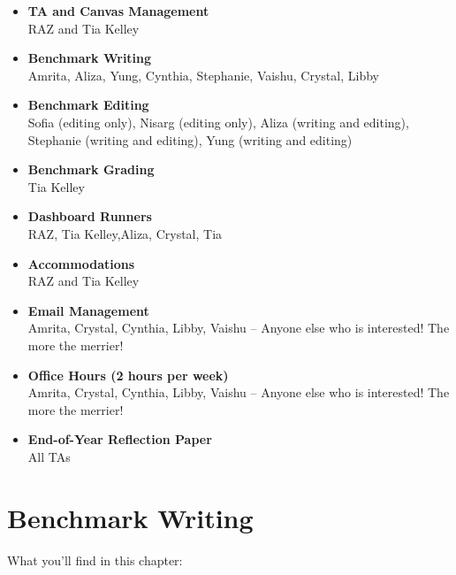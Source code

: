 \documentclass[
]{article}
\begin{document}
\begin{itemize}
\item
  \textbf{TA and Canvas Management}\\
  RAZ and Tia Kelley
\item
  \textbf{Benchmark Writing}\\
  Amrita, Aliza, Yung, Cynthia, Stephanie, Vaishu, Crystal, Libby
\item
  \textbf{Benchmark Editing}\\
  Sofia (editing only), Nisarg (editing only), Aliza (writing and editing), Stephanie (writing and editing), Yung (writing and editing)
\item
  \textbf{Benchmark Grading}\\
  Tia Kelley
\item
  \textbf{Dashboard Runners}\\
  RAZ, Tia Kelley,Aliza, Crystal, Tia
\item
  \textbf{Accommodations}\\
  RAZ and Tia Kelley
\item
  \textbf{Email Management}\\
  Amrita, Crystal, Cynthia, Libby, Vaishu -- Anyone else who is interested! The more the merrier!
\item
  \textbf{Office Hours (2 hours per week)}\\
  Amrita, Crystal, Cynthia, Libby, Vaishu -- Anyone else who is interested! The more the merrier!
\item
  \textbf{End-of-Year Reflection Paper}\\
  All TAs
\end{itemize}

\hypertarget{benchmark-writing}{%
\section{Benchmark Writing}\label{benchmark-writing}}

What you'll find in this chapter:
\end{document}
